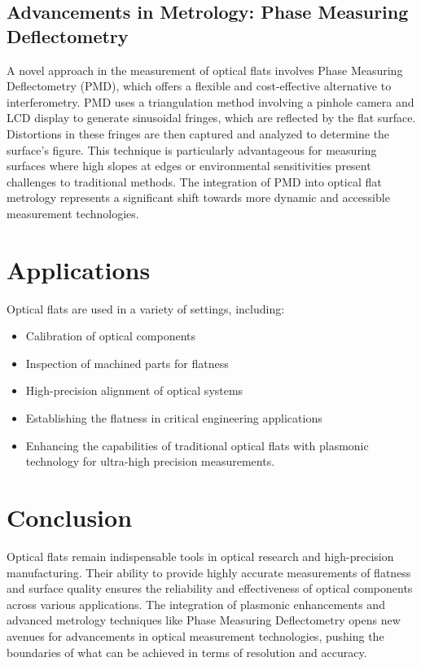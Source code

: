 \documentclass[../main.tex]{subfiles}
\begin{document}
\subsection{Advancements in Metrology: Phase Measuring Deflectometry}
A novel approach in the measurement of optical flats involves Phase Measuring Deflectometry (PMD), which offers a flexible and cost-effective alternative to interferometry. PMD uses a triangulation method involving a pinhole camera and LCD display to generate sinusoidal fringes, which are reflected by the flat surface. Distortions in these fringes are then captured and analyzed to determine the surface's figure. This technique is particularly advantageous for measuring surfaces where high slopes at edges or environmental sensitivities present challenges to traditional methods. The integration of PMD into optical flat metrology represents a significant shift towards more dynamic and accessible measurement technologies.

\section{Applications}
Optical flats are used in a variety of settings, including:
\begin{itemize}
    \item Calibration of optical components
    \item Inspection of machined parts for flatness
    \item High-precision alignment of optical systems
    \item Establishing the flatness in critical engineering applications
    \item Enhancing the capabilities of traditional optical flats with plasmonic technology for ultra-high precision measurements.
\end{itemize}

\section{Conclusion}
Optical flats remain indispensable tools in optical research and high-precision manufacturing. Their ability to provide highly accurate measurements of flatness and surface quality ensures the reliability and effectiveness of optical components across various applications. The integration of plasmonic enhancements and advanced metrology techniques like Phase Measuring Deflectometry opens new avenues for advancements in optical measurement technologies, pushing the boundaries of what can be achieved in terms of resolution and accuracy.
\end{document}
